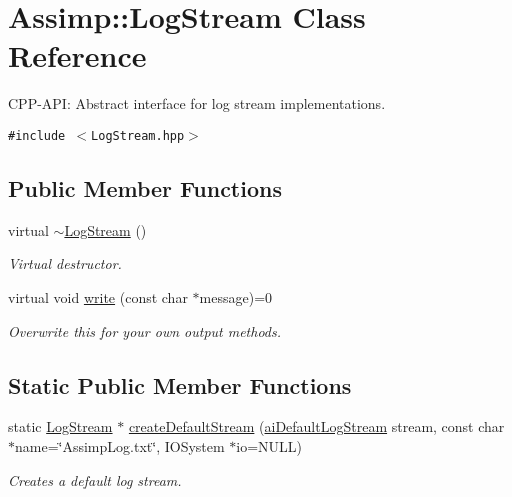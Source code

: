 \hypertarget{class_assimp_1_1_log_stream}{
\section{Assimp::LogStream Class Reference}
\label{class_assimp_1_1_log_stream}
}
CPP-API: Abstract interface for log stream implementations.  


{\tt \#include $<$LogStream.hpp$>$}

\subsection*{Public Member Functions}
\begin{CompactItemize}
\item 
\hypertarget{class_assimp_1_1_log_stream_2cf7080efeb4999a02689f2a31843da2}{
virtual \hyperlink{class_assimp_1_1_log_stream_2cf7080efeb4999a02689f2a31843da2}{$\sim$LogStream} ()}
\label{class_assimp_1_1_log_stream_2cf7080efeb4999a02689f2a31843da2}

\begin{CompactList}\small\item\em Virtual destructor. \item\end{CompactList}\item 
virtual void \hyperlink{class_assimp_1_1_log_stream_b0bfcb5ab9988ef65d7222a50f6e8d37}{write} (const char $\ast$message)=0
\begin{CompactList}\small\item\em Overwrite this for your own output methods. \item\end{CompactList}\end{CompactItemize}
\subsection*{Static Public Member Functions}
\begin{CompactItemize}
\item 
static \hyperlink{class_assimp_1_1_log_stream}{LogStream} $\ast$ \hyperlink{class_assimp_1_1_log_stream_6b358a4a79b2e9ba2025e10d3e9405e3}{createDefaultStream} (\hyperlink{types_8h_e4271f61a7c06cd4770fc3e11f58f9c6}{aiDefaultLogStream} stream, const char $\ast$name=\char`\"{}AssimpLog.txt\char`\"{}, IOSystem $\ast$io=NULL)
\begin{CompactList}\small\item\em Creates a default log stream. \item\end{CompactList}\end{CompactItemize}
